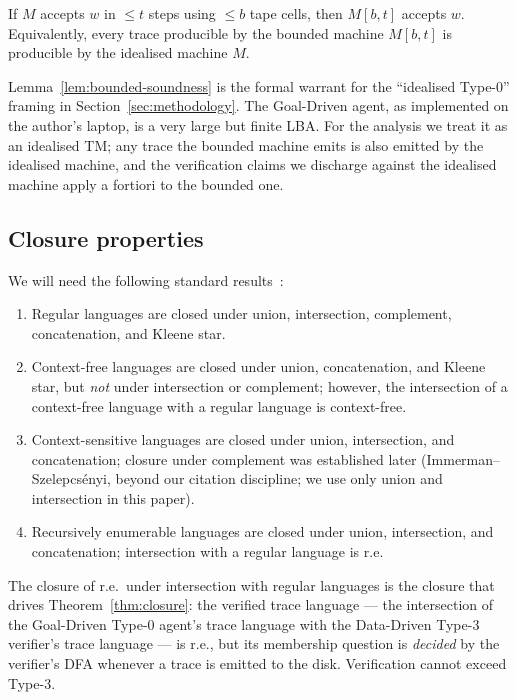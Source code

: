\begin{lemma}
\label{lem:bounded-soundness}
If $M$ accepts $w$ in $\le t$ steps using $\le b$ tape cells, then
$M[b,t]$ accepts $w$.  Equivalently, every trace producible by
the bounded machine $M[b,t]$ is producible by the idealised
machine $M$.
\end{lemma}

Lemma~\ref{lem:bounded-soundness} is the formal warrant for the
``idealised Type-0'' framing in
Section~\ref{sec:methodology}.  The Goal-Driven agent, as
implemented on the author's laptop, is a very large but finite
LBA.  For the analysis we treat it as an idealised TM; any trace
the bounded machine emits is also emitted by the idealised
machine, and the verification claims we discharge against the
idealised machine apply a fortiori to the bounded one.

\subsection{Closure properties}

We will need the following standard
results~\cite{hopcroft2006automata}:
\begin{enumerate}
\item Regular languages are closed under union, intersection,
complement, concatenation, and Kleene star.
\item Context-free languages are closed under union, concatenation,
and Kleene star, but \emph{not} under intersection or complement;
however, the intersection of a context-free language with a
regular language is context-free.
\item Context-sensitive languages are closed under union,
intersection, and concatenation; closure under complement was
established later (Immerman--Szelepcs\'enyi, beyond our citation
discipline; we use only union and intersection in this paper).
\item Recursively enumerable languages are closed under union,
intersection, and concatenation; intersection with a regular
language is r.e.
\end{enumerate}

The closure of r.e.\ under intersection with regular languages is
the closure that drives Theorem~\ref{thm:closure}: the verified
trace language --- the intersection of the Goal-Driven Type-0
agent's trace language with the Data-Driven Type-3 verifier's
trace language --- is r.e., but its membership question is
\emph{decided} by the verifier's DFA whenever a trace is emitted
to the disk.  Verification cannot exceed Type-3.
